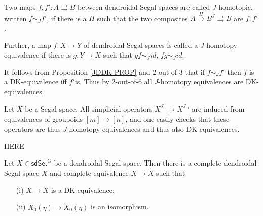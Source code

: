 \documentclass[a4paper,10p,draft]{article}%
\numberwithin{equation}{section}%
\begin{document}
\begin{definition}
	Two maps $f,f'\colon A \rightrightarrows B$ between dendroidal Segal spaces are called $J$-homotopic, written $f \sim_J f'$, if
	there is a $H$ such that
	the two composites
	$A \xrightarrow{H} B^J \rightrightarrows B$
	are $f,f'$.
	
	Further, a map $f\colon X \to Y$ of dendroidal Segal spaces is called a $J$-homotopy equivalence if there is $g \colon Y \to X$
	such that $gf \sim_J id$, $fg \sim_J id$.
\end{definition}

\begin{remark}
	It follows from Proposition \ref{JDDK PROP} and 2-out-of-3 that if 
	$f\sim_J f'$ then $f$ is a DK-equivalence iff $f'$is.
	Thus by 2-out-of-6 all $J$-homotopy equivalences are DK-equivalences.
\end{remark}

\begin{remark}\label{ALLXJK REM}
	Let $X$ be a Segal space. All simplicial operators
	$X^{J_n} \to X^{J_m}$ are induced from equivalences of groupoids $\widetilde{[m]} \to \widetilde{[n]}$, and one easily checks that these operators are thus $J$-homotopy equivalences and thus also DK-equivalences.
\end{remark}


{\color{red} HERE}


\begin{proposition}
Let $X \in \mathsf{sdSet}^G$ be a dendroidal Segal space. 
Then there is a complete dendroidal Segal space $\tilde{X}$
and complete equivalence $X \to \tilde{X}$ such that
\begin{itemize}
	\item[(i)] $X \to \tilde{X}$ is a DK-equivalence;
	\item[(ii)] $X_0(\eta) \to \tilde{X}_0(\eta)$ is an isomorphism.
\end{itemize}
\end{proposition}
\end{document}
